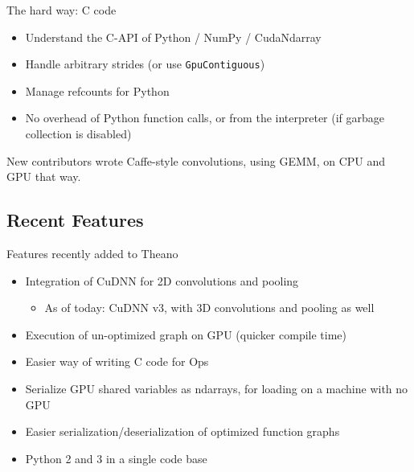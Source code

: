 \documentclass[a4paper,9pt]{beamer}
\begin{document}
\begin{frame}[fragile]{The hard way: C code}
  \begin{itemize}
    \item Understand the C-API of Python / NumPy / CudaNdarray
    \item Handle arbitrary strides (or use \verb|GpuContiguous|)
    \item Manage refcounts for Python
    \item No overhead of Python function calls, or from the interpreter (if garbage
      collection is disabled)
  \end{itemize}
  New contributors wrote Caffe-style convolutions, using GEMM, on CPU and GPU that way.
\end{frame}

\subsection{Recent Features}
\begin{frame}{Features recently added to Theano}
  \begin{itemize}
    \item Integration of CuDNN for 2D convolutions and pooling
      \begin{itemize}
        \item As of today: CuDNN v3, with 3D convolutions and pooling as well
      \end{itemize}
    \item Execution of un-optimized graph on GPU (quicker compile time)
    \item Easier way of writing C code for Ops
    \item Serialize GPU shared variables as ndarrays, for loading on a machine with no GPU
    \item Easier serialization/deserialization of optimized function graphs
    \item Python 2 and 3 in a single code base
  \end{itemize}
\end{frame}
\end{document}
